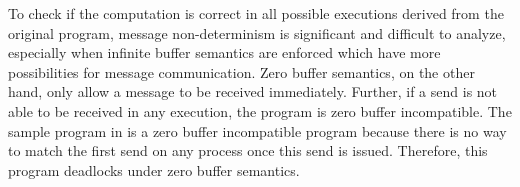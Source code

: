 To check if the computation is correct in all possible executions derived from the original program, message non-determinism is significant and difficult to analyze, especially when infinite buffer semantics are enforced which have more possibilities for message communication. Zero buffer semantics, on the other hand, only allow a message to be received immediately. Further, if a send is not able to be received in any execution, the program is zero buffer incompatible. The sample program in  is a zero buffer incompatible program because there is no way to match the first send on any process once this send is issued. Therefore, this program deadlocks under zero buffer semantics. 



